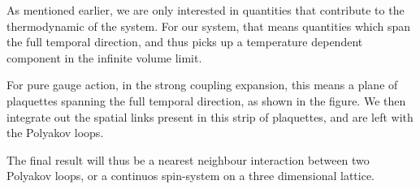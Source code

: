 \documentclass[12pt,a4paper,dvipsnames,usenames,handout]{beamer}
\begin{document}
\begin{frame}

  {
    As mentioned earlier, we are only interested in quantities that contribute to the thermodynamic of the system. For our system,
    that means quantities which span the full temporal direction, and thus picks up a temperature dependent component in the
    infinite volume limit.

    For pure gauge action, in the strong coupling expansion, this means a plane of plaquettes spanning the full temporal
    direction, as shown in the figure. We then integrate out the spatial links present in this strip of plaquettes, and are left
    with the Polyakov loops.
  }

  {
    The final result will thus be a nearest neighbour interaction between two Polyakov loops, or a continuos spin-system on a
    three dimensional lattice.
  }
\end{frame}
\end{document}
